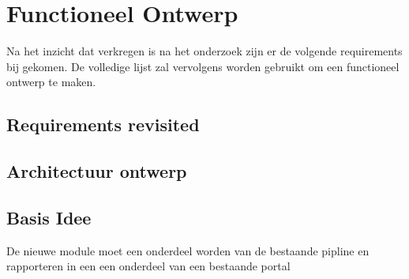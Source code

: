
\chapter{Functioneel Ontwerp}\label{ch:functioneel-ontwerp} %

\label{funtioneelOntwerp} %


Na het inzicht dat verkregen is na het onderzoek zijn er de volgende requirements bij gekomen.
De volledige lijst zal vervolgens worden gebruikt om een functioneel ontwerp te maken.

\section{Requirements revisited}\label{sec:requirements-revisited}


\section{Architectuur ontwerp}\label{sec:architectuur-ontwerp}

\section{Basis Idee}\label{sec:basis-idee}
De nieuwe module moet een onderdeel worden van de bestaande pipline en rapporteren in een een onderdeel van een bestaande portal
